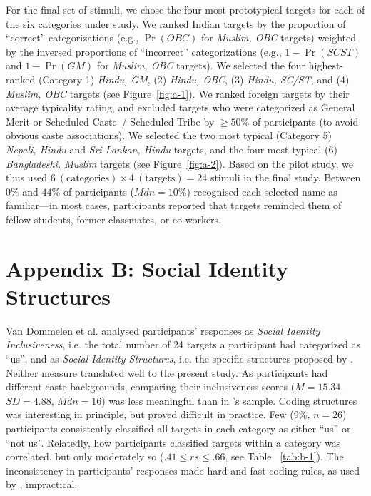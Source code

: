 \documentclass[12pt, a4paper]{article}
\begin{document}
For the final set of stimuli, we chose the four most prototypical targets for each of the six categories under study. We ranked Indian targets by the proportion of ``correct'' categorizations (e.g., $\Pr(\textit{OBC})$ for \emph{Muslim, OBC} targets) weighted by the inversed proportions of ``incorrect'' categorizations (e.g., $1 - \Pr(\textit{SCST})$ and $1 - \Pr(\textit{GM})$ for \emph{Muslim, OBC} targets). We selected the four highest-ranked (Category 1) \emph{Hindu, GM}, (2) \emph{Hindu, OBC}, (3) \emph{Hindu, SC/ST}, and (4) \emph{Muslim, OBC} targets (see Figure~\ref{fig:a-1}). We ranked foreign targets by their average typicality rating, and excluded targets who were categorized as General Merit or Scheduled Caste~/ Scheduled Tribe by $\ge 50\%$ of participants (to avoid obvious caste associations). We selected the two most typical (Category 5) \emph{Nepali, Hindu} and \emph{Sri Lankan, Hindu} targets, and the four most typical (6) \emph{Bangladeshi, Muslim} targets (see Figure~\ref{fig:a-2}). Based on the pilot study, we thus used $6~(\text{categories}) \times 4~(\text{targets}) = 24$ stimuli in the final study. Between $0\%$ and $44\%$ of participants ($\textit{Mdn} = 10\%$) recognised each selected name as familiar---in most cases, participants reported that targets reminded them of fellow students, former classmates, or co-workers.

\section{Appendix B: Social Identity Structures}

Van Dommelen et al. \citeyear{dommelen_construing_2015} analysed participants' responses as \emph{Social Identity Inclusiveness}, i.e. the total number of 24 targets a participant had categorized as ``us'', and as \emph{Social Identity Structures}, i.e. the specific structures proposed by . Neither measure translated well to the present study. As participants had different caste backgrounds, comparing their inclusiveness scores ($M = 15.34$, $\textit{SD} = 4.88$, $\textit{Mdn} = 16$) was less meaningful than in \citeauthor{dommelen_construing_2015}'s sample. Coding structures was interesting in principle, but proved difficult in practice.  Few (9\%, $n = 26$) participants consistently classified all targets in each category as either ``us'' or ``not us''. Relatedly, how participants classified targets within a category was correlated, but only moderately so ($.41 \leq rs \leq.66$, see Table ~\ref{tab:b-1}). The inconsistency in participants' responses made hard and fast coding rules, as used by \citeauthor{dommelen_construing_2015}, impractical.
\end{document}
